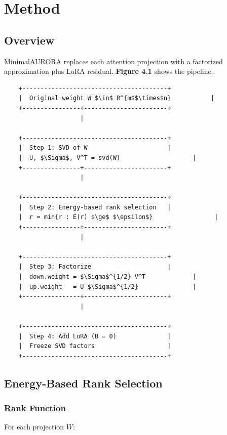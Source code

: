 \section{Method}

\subsection{Overview}

MinimalAURORA replaces each attention projection with a factorized 
approximation plus LoRA residual. \textbf{Figure 4.1} shows the pipeline.

\begin{lstlisting}
    +----------------------------------------+
    |  Original weight W $\in$ R^{m$$\times$n}           |
    +----------------+-----------------------+
                     |
                      
    +----------------------------------------+
    |  Step 1: SVD of W                      |
    |  U, $\Sigma$, V^T = svd(W)                    |
    +----------------+-----------------------+
                     |
                      
    +----------------------------------------+
    |  Step 2: Energy-based rank selection   |
    |  r = min{r : E(r) $\ge$ $\epsilon$}                 |
    +----------------+-----------------------+
                     |
                      
    +----------------------------------------+
    |  Step 3: Factorize                     |
    |  down.weight = $\Sigma$^{1/2} V^T             |
    |  up.weight   = U $\Sigma$^{1/2}               |
    +----------------+-----------------------+
                     |
                      
    +----------------------------------------+
    |  Step 4: Add LoRA (B = 0)              |
    |  Freeze SVD factors                    |
    +----------------------------------------+
\end{lstlisting}

\subsection{Energy-Based Rank Selection}

\subsubsection{Rank Function}

For each projection $W$:

